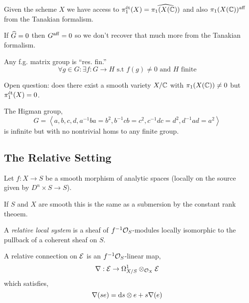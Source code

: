 \documentclass[12pt]{article}
\begin{document}
\begin{rmk}
Given the scheme $X$ we have access to $\pi_1^{\text{\'{e}t}}(X) = \widehat{\pi_1(X(\mathbb{C}))}$ and also $\pi_1(X(\mathbb{C}))^{\mathrm{aff}}$ from the Tanakian formalism. 
\end{rmk}

\begin{prop}
If $\widehat{G} = 0$ then $G^{\mathrm{aff}} = 0$ so we don't recover that much more from the Tanakian formalism. 
\end{prop}

\begin{prop}
Any f.g. matrix group is ``res. fin.'' 
\[ \forall g \in G : \exists f:  G \to H \text{ s.t } f(g) \neq 0 \text{ and } H \text{ finite} \] 
\end{prop}

\begin{rmk}
Open question: does there exist a smooth variety $X / \mathbb{C}$ with $\pi_1(X(\mathbb{C})) \neq 0$ but $\pi_1^{\text{\'{e}t}}(X) = 0$. 
\end{rmk}

\begin{example}
The Higman group,
\[ G = \left< a,b,c,d, a^{-1} b a = b^2, b^{-1} c b = c^2, c^{-1} d c = d^2, d^{-1} a d = a^2 \right> \]
is infinite but with no nontrivial homs to any finite group. 
\end{example}

\subsection{The Relative Setting}

\begin{defn}
Let $f : X \to S$ be a smooth morphism of analytic spaces (locally on the source given by $D^n \times S \to S$). 
\end{defn}

\begin{rmk}
If $S$ and $X$ are smooth this is the same as a submersion by the constant rank theoem. 
\end{rmk}

\begin{defn}
A \textit{relative local system} is a sheaf of $f^{-1} \mathcal{O}_{S}$-modules locally isomorphic to the pullback of a coherent sheaf on $S$. 
\end{defn}

\begin{defn}
A relative connection on $\mathcal{E}$ is an $f^{-1} \mathcal{O}_{S}$-linear map,
\[ \nabla : \mathcal{E} \to \Omega^1_{X/S} \otimes_{\mathcal{O}_{X}} \mathcal{E} \]
which satisfies,
\[ \nabla(se) = \mathrm{d}{s} \otimes e + s \nabla (e) \]
\end{defn}
\end{document}
